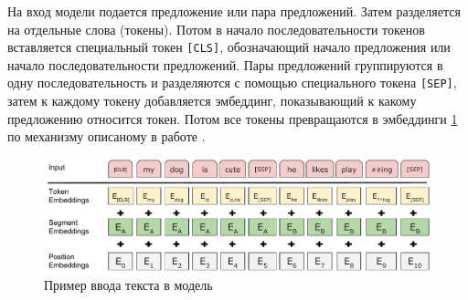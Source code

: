 \documentclass[PI, VKR]{HSEUniversity}
\begin{document}
На вход модели подается предложение или пара предложений. Затем разделяется на отдельные слова (токены). Потом в начало последовательности токенов вставляется специальный токен \texttt{[CLS]}, обозначающий начало предложения или начало последовательности предложений. Пары предложений группируются в одну последовательность и разделяются с помощью специального токена \texttt{[SEP]}, затем к каждому токену добавляется эмбеддинг, показывающий к какому предложению относится токен. Потом все токены превращаются в эмбеддинги \ref{fig:inputemebeddings} по механизму описаному в работе \autocite{vaswani_attention_2017}.

\begin{figure}[h]
\centering
\includegraphics[width=.9\linewidth]{img/Input_Emebeddings.pdf}
\caption{\label{fig:inputemebeddings}Пример ввода текста в модель}
\end{figure}
\end{document}
